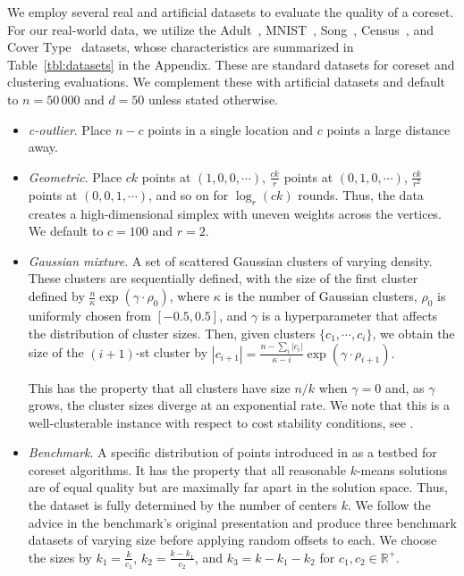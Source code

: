 We employ several real and artificial datasets to evaluate the quality of a coreset.  For our real-world data, we utilize the Adult~\cite{Dua:2019},
MNIST~\cite{mnist}, Song~\cite{song}, Census~\cite{census}, and Cover Type~\cite{covtype} datasets, whose characteristics are summarized in
Table~\ref{tbl:datasets} in the Appendix. These are standard datasets for coreset and clustering evaluations.
We complement these with artificial datasets and default to $n = 50\,000$ and $d=50$ unless stated otherwise.
\begin{itemize}

    \item \emph{c-outlier}. Place $n-c$ points in a single location and $c$ points a large distance away.

    \item \emph{Geometric}. Place $c k$ points at $(1, 0, 0, \cdots)$, $\frac{ck}{r}$ points at $(0, 1, 0, \cdots)$, $\frac{ck}{r^2}$ points
        at $(0, 0, 1, \cdots)$, and so on for $\log_r (ck)$ rounds. Thus, the data creates a high-dimensional simplex with uneven weights across the vertices. We
        default to $c = 100$ and $r=2$.

    \item \emph{Gaussian mixture}. A set of scattered Gaussian clusters of varying density. These clusters are sequentially defined, with the size of the first
        cluster defined by $\frac{n}{\kappa} \exp \left( \gamma \cdot \rho_0 \right)$, where $\kappa$ is the number of Gaussian clusters, $\rho_0$ is uniformly
        chosen from $[-0.5, 0.5]$, and $\gamma$ is a hyperparameter that affects the distribution of cluster sizes.  Then, given clusters $\{c_1, \cdots,
        c_i\}$, we obtain the size of the $(i+1)$-st cluster by $|c_{i+1}| = \frac{n - \sum_i |c_i|}{\kappa - i}\exp \left( \gamma \cdot \rho_{i+1} \right).$

        This has the property that all clusters have size $n / k$ when $\gamma = 0$ and, as $\gamma$ grows, the cluster sizes diverge at an exponential rate.
        We note that this is a well-clusterable instance with respect to cost stability conditions, see \cite{AwS12,Cohen-AddadS17,KuK10,ORSS12}.

    \item \emph{Benchmark}. A specific distribution of points introduced in \cite{chrisESA} as a testbed for coreset algorithms.  It has the property that
        all reasonable $k$-means solutions are of equal quality but are maximally far apart in the solution space. Thus, the dataset is fully determined by the
        number of centers $k$. We follow the advice in the benchmark's original presentation and produce three benchmark datasets of varying size before
        applying random offsets to each. We choose the sizes by $k_1 = \frac{k}{c_1}$, $k_2 = \frac{k - k_1}{c_2}$, and $k_3 = k - k_1 - k_2$ for $c_1, c_2 \in
        \mathbb{R}^+$.

\end{itemize}

